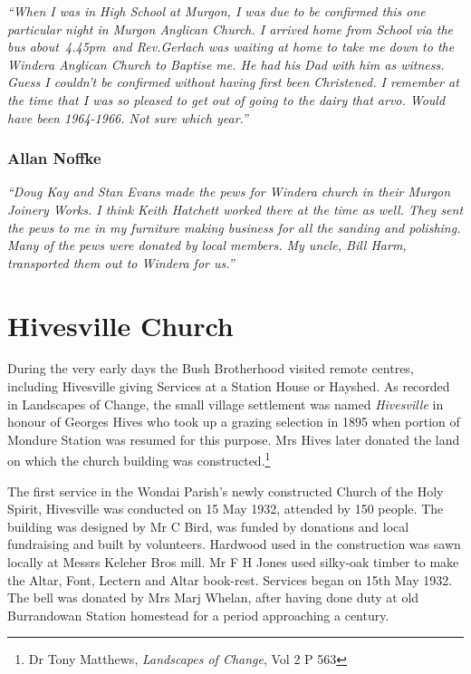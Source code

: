 \emph{``When I was in High School at Murgon, I was due to be confirmed this one particular night in Murgon Anglican Church. I arrived home from School via the bus about~4.45pm~and Rev.Gerlach was waiting at home to take me down to the Windera Anglican Church to Baptise me. He had his Dad with him as witness. Guess I couldn't be confirmed without having first been Christened. I remember at the time that I was so pleased to get out of going to the dairy that arvo. Would have been 1964-1966. Not sure which year.''}



\subsubsection{Allan Noffke}



\emph{``Doug Kay and Stan Evans made the pews for Windera church in their Murgon Joinery Works. I think Keith Hatchett worked there at the time as well. They sent the pews to me in my furniture making business for all the sanding and polishing. Many of the pews were donated by local members. My uncle, Bill Harm, transported them out to Windera for us.''}



\section{Hivesville Church}



During the very early days the Bush Brotherhood visited remote centres, including Hivesville giving Services at a Station House or Hayshed. As recorded in Landscapes of Change, the small village settlement was named \emph{Hivesville} in honour of Georges Hives who took up a grazing selection in 1895 when portion of Mondure Station was resumed for this purpose. Mrs Hives later donated the land on which the church building was constructed.\footnote{Dr Tony Matthews, \emph{Landscapes of Change}, Vol 2 P 563}


The first service in the Wondai Parish's newly constructed Church of the Holy Spirit, Hivesville was conducted on 15 May 1932, attended by 150 people. The building was designed by Mr C Bird, was funded by donations and local fundraising and built by volunteers. Hardwood used in the construction was sawn locally at Messrs Keleher Bros mill. Mr F H Jones used silky-oak timber to make the Altar, Font, Lectern and Altar book-rest. Services began on 15th May 1932. The bell was donated by Mrs Marj Whelan, after having done duty at old Burrandowan Station homestead for a period approaching a century.



